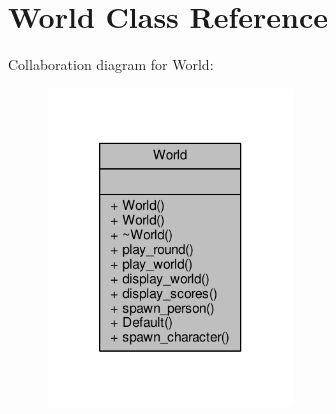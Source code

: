 \hypertarget{class_world}{\section{World Class Reference}
\label{class_world}
}


Collaboration diagram for World\-:
\nopagebreak
\begin{figure}[H]
\begin{center}
\leavevmode
\includegraphics[width=184pt]{class_world__coll__graph}
\end{center}
\end{figure}
